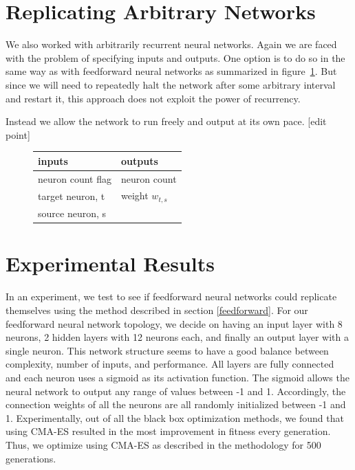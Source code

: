 \documentclass[12pt]{article}
\begin{document}
\section{Replicating Arbitrary Networks}
\label{arbitrary}

We also worked with arbitrarily recurrent neural networks.
Again we are faced with the problem
of specifying inputs and outputs.
One option is to do so in the same way
as with feedforward neural networks
as summarized in figure~\ref{arbitrarybadio}.
But since we will need
to repeatedly halt the network
after some arbitrary interval
and restart it,
this approach does not exploit
the power of recurrency.

Instead we allow the network to run freely
and output at its own pace.
[edit point]

\begin{figure}[h]
  \centering
  \begin{tabular}{ll}
  \toprule
  inputs            & outputs \\
  \midrule
  neuron count flag & neuron count \\
  target neuron, t  & weight $w_{t,s}$ \\
  source neuron, s  & \\
  \bottomrule
  \end{tabular}
  \caption{}
  \label{arbitrarybadio}
\end{figure}

\section{Experimental Results}
\label{results}

In an experiment, we test to see if feedforward neural networks
could replicate themselves using the method described
in section \ref{feedforward}.
For our feedforward neural network topology,
we decide on having an input layer with 8 neurons,
2 hidden layers with 12 neurons each,
and finally an output layer with a single neuron.
This network structure seems to have a good balance
between complexity, number of inputs, and performance.
All layers are fully connected
and each neuron uses a sigmoid
as its activation function.
The sigmoid allows the neural network
to output any range of values between -1 and 1.
Accordingly, the connection weights
of all the neurons are all randomly initialized between -1 and 1.
Experimentally, out of all the black box optimization methods, 
we found that using CMA-ES resulted in the most improvement 
in fitness every generation. Thus, we optimize using CMA-ES
as described in the methodology for 500 generations.
\end{document}
